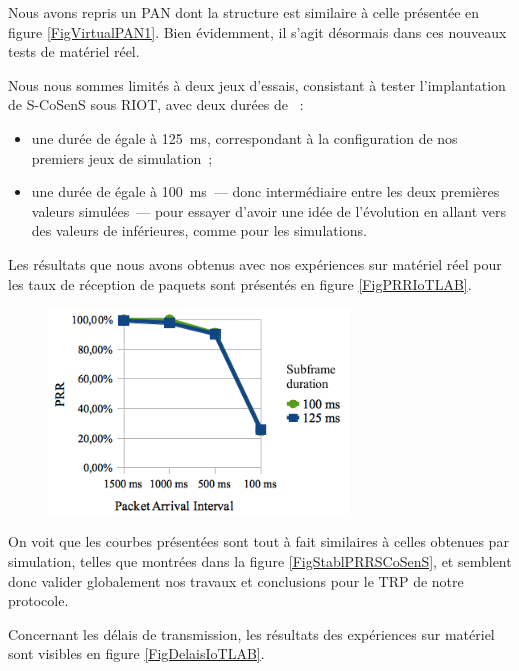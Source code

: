 Nous avons repris un PAN dont la structure est similaire à celle présentée
en figure \vref{FigVirtualPAN1}. Bien évidemment, il s'agit désormais
dans ces nouveaux tests de matériel réel.

Nous nous sommes limités à deux jeux d'essais, consistant à tester
l'implantation de S-CoSenS sous RIOT, avec deux durées de ~:
\begin{itemize}
\item une durée de  égale à 125~ms, correspondant à la
configuration de nos premiers jeux de simulation~;
\item une durée de  égale à 100~ms~--- donc intermédiaire
entre les deux premières valeurs simulées~--- pour essayer d'avoir une
idée de l'évolution en allant vers des valeurs de 
inférieures, comme pour les simulations.
\end{itemize}

Les résultats que nous avons obtenus avec nos expériences sur matériel
réel pour les taux de réception de paquets sont présentés en figure
\vref{FigPRRIoTLAB}.

\begin{figure}[htb]
\centering
\includegraphics[width=8cm]{images/ch5-trp-iot-lab.png}
\label{FigPRRIoTLAB}
\end{figure}

\bigskip

On voit que les courbes présentées sont tout à fait similaires
à celles obtenues par simulation, telles que montrées dans la figure
\vref{FigStablPRRSCoSenS}, et semblent donc valider globalement
nos travaux et conclusions pour le TRP de notre protocole.

\smallskip

Concernant les délais de transmission, les résultats des expériences
sur matériel sont visibles en figure \vref{FigDelaisIoTLAB}.

